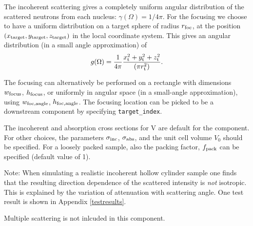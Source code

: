The incoherent scattering gives
a completely uniform angular distribution of the scattered
neutrons from each nucleus: $\gamma(\Omega) = 1/4\pi$.
For the focusing we choose to have a uniform distribution on
a target sphere of radius $r_{\rm foc}$, at the position 
$(x_{\rm target},y_{\rm target},z_{\rm target})$
in the local coordinate system.
This gives an angular distribution (in a small angle approximation)
of 
\begin{equation}
g(\Omega) = \frac{1}{4\pi} 
  \frac{x_{\rm t}^2+y_{\rm t}^2+z_{\rm t}^2}{(\pi r_{\rm t}^2)}.
\end{equation}

The focusing can alternatively be performed on a rectangle with dimensions
$w_{\rm focus}$, $h_{\rm focus}$, or uniformly in angular space 
(in a small-angle approximation), 
using $w_{\rm foc, angle}$, $h_{\rm foc, angle}$.
The focusing location can be picked to be a downstream component by
specifying \verb+target_index+.

The incoherent and absorption cross sections for V are default
for the component. For other choices, the
parameters $\sigma_{\rm inc}$, $\sigma_{\rm abs}$, 
and the unit cell volume $V_0$ should be specified.
For a loosely packed sample, also the packing factor, $f_{\rm pack}$ 
can be specified (default value of 1).

Note: When simulating a realistic incoherent hollow cylinder sample 
one finds that  the resulting direction dependence 
of the scattered intensity is {\em not} isotropic.
This is explained by the variation of attenuation with
scattering angle.
One test result is shown in Appendix \ref{testresults}.

Multiple scattering is not inlcuded in this component.
